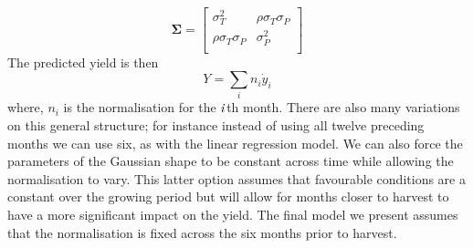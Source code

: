 \documentclass[12pt]{iopart}
\begin{document}
\begin{equation}
\label{eqn:2d_gaussian_sigma}
    \boldsymbol\Sigma = \left[ {\begin{array}{cc}
    \sigma_T^2 & \rho \sigma_T \sigma_P \\
    \rho \sigma_T \sigma_P  & \sigma_P^2 \\
    \end{array} } \right]
\end{equation}
The predicted yield is then
\begin{equation}
\label{eqn:yield_sum}
Y = \sum_i n_i \dot{y}_i
\end{equation}
where, $n_i$ is the normalisation for the $\it{i}$th month. There are also many variations on this general structure; for instance instead of using all twelve preceding months we can use six, as with the linear regression model. We can also force the parameters of the Gaussian shape to be constant across time while allowing the normalisation to vary. This latter option assumes that favourable conditions are a constant over the growing period but will allow for months closer to harvest to have a more significant impact on the yield. The final model we present assumes that the normalisation is fixed across the six months prior to harvest.
\end{document}

